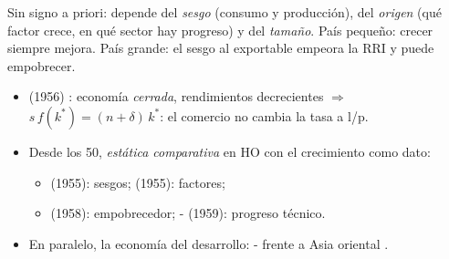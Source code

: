 \documentclass{article}
\begin{document}
\begin{columnas}
\begin{ideaclave}
Sin signo a priori: depende del \emph{sesgo} (consumo y producción), del \emph{origen} (qué factor crece, en qué sector hay progreso) y del \emph{tamaño}. País pequeño: crecer siempre mejora. País grande: el sesgo al exportable empeora la RRI y puede empobrecer.
\end{ideaclave}

\begin{itemize}
\item {} (1956) : economía \emph{cerrada}, rendimientos decrecientes $\Rightarrow$ $s\,f(k^*)=(n+\delta)\,k^*$: el comercio no cambia la tasa a l/p.
\item Desde los 50, \emph{estática comparativa} en HO con el crecimiento como dato:
  \begin{itemize}
  \item {} (1955): sesgos;  (1955): factores;
  \item {} (1958): empobrecedor; - (1959): progreso técnico.
  \end{itemize}
\item En paralelo, la economía del desarrollo: - frente a Asia oriental .
\end{itemize}


\end{columnas}
\end{document}
